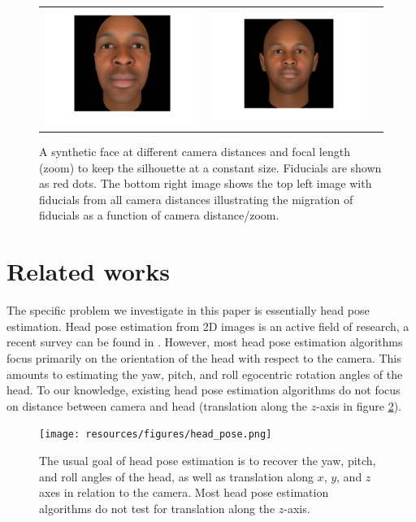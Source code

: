 \documentclass[runningheads]{llncs}
\begin{document}
\begin{figure}[ht]
\begin{tabular}{ccc}
\includegraphics[width=.25\linewidth]{resources/figures/extracted_fiducial_0007.png} &
\includegraphics[width=.25\linewidth]{resources/figures/fiducial_migration.png}
\end{tabular}
\caption{A synthetic face at different camera distances and focal length (zoom) to keep the silhouette at a constant size.  
Fiducials are shown as red dots.  
The bottom right image shows the top left image with fiducials from all camera distances illustrating the migration of fiducials as a function of camera distance/zoom.} 
\label{fig:fiducial_migration}
\end{figure}

\section{Related works}
The specific problem we investigate in this paper is essentially head pose estimation.  
Head pose estimation from 2D images is an active field of research, a recent survey can be found in \cite{murphy2009head}. 
However, most head pose estimation algorithms focus primarily on the orientation of the head with respect to the camera. 
This amounts to estimating the yaw, pitch, and roll egocentric rotation angles of the head. 
To our knowledge, existing head pose estimation algorithms do not focus on distance between camera and head (translation along the $z$-axis in figure \ref{fig:head_pose}).

\begin{figure}[ht]
\centering
\texttt{[image: resources/figures/head\_pose.png]}
\caption{The usual goal of head pose estimation is to recover the yaw, pitch, and roll angles of the head, as well as translation along $x$, $y$, and $z$ axes in relation to the camera. 
Most head pose estimation algorithms do not test for translation along the $z$-axis.}
\label{fig:head_pose}
\end{figure}
\end{document}

